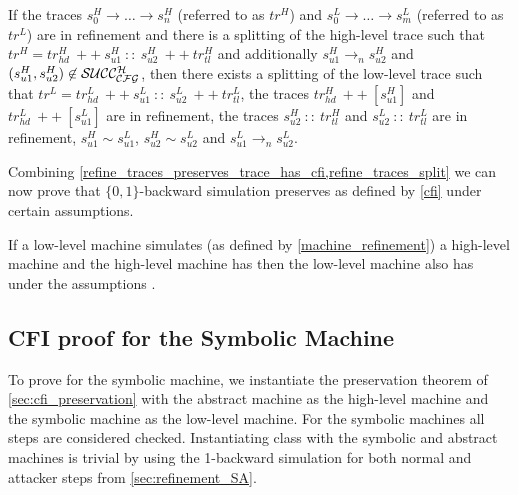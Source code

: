 
\begin{lemma}
\label{refine_traces_split}
\renewcommand{\baselinestretch}{1.25}\normalsize
If the traces $s^H_0 \to \ldots \to s^H_n$ (referred to as $tr^H$) and $s^L_0 \to
\ldots \to s^L_m$ (referred to as $tr^L$) are in refinement and there is a splitting
of the high-level trace such that $tr^H = tr^H_{hd} ~ ++ ~ s^H_{u1}
~ :: ~ s^H_{u2} ~ ++ ~ tr^H_{tl}$ and additionally $s^H_{u1} \to_n s^H_{u2}$
and $(s^H_{u1},s^H_{u2}) \not \in \mathcal{SUCC_\mathcal{CFG}^{H}}$, then there exists a
splitting of the low-level trace such that $tr^L = tr^L_{hd} ~ ++ ~
s^L_{u1} ~ :: ~ s^L_{u2} ~ ++ ~ tr^L_{tl}$, the traces $tr^H_{hd} ~ ++ ~
[s^H_{u1}]$ and $tr^L_{hd} ~ ++ ~ [s^L_{u1}]$ are in refinement, the
traces $s^H_{u2} ~ :: ~ tr^H_{tl}$ and $s^L_{u2} ~ :: ~ tr^L_{tl}$ are in
refinement, $s^H_{u1} \sim s^L_{u1}$, $s^H_{u2} \sim s^L_{u2}$ and
$s^L_{u1} \to_n s^L_{u2}$.
\end{lemma}

Combining
\cref{refine_traces_preserves_trace_has_cfi,refine_traces_split} we
can now prove that $\lbrace 0,1 \rbrace$-backward simulation preserves
\CFI as defined by \cref{cfi} under certain assumptions.

\begin{theorem}
\label{backward_refinement_preserves_cfi}
If a low-level machine simulates (as defined by
\cref{machine_refinement}) a high-level machine and the high-level
machine has \CFI then the low-level machine also has \CFI under the
assumptions .
\end{theorem}

\subsection{CFI proof for the Symbolic Machine}
\label{sec:symbolic_proof}

To prove \CFI for the symbolic machine, we instantiate the
preservation theorem of \cref{sec:cfi_preservation} with the abstract
machine as the high-level machine and the symbolic machine as the
low-level machine. For the symbolic machines all steps are considered
checked. Instantiating class  with the
symbolic and abstract machines is trivial by using the 1-backward simulation
for both normal and attacker steps from \cref{sec:refinement_SA}.

